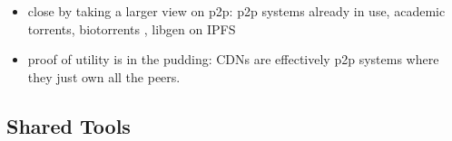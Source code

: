 \documentclass[10pt]{article}
\begin{document}
\begin{multicols}{2}
\begin{itemize}

\item
  close by taking a larger view on p2p: p2p systems already in use,
  academic torrents, biotorrents \cite{langilleBioTorrentsFileSharing2010} , libgen on IPFS
\item
  proof of utility is in the pudding: CDNs are effectively p2p systems
  where they just own all the peers.
\end{itemize}


\end{multicols}


\hypertarget{shared-tools}{%
\subsection{Shared Tools}\label{shared-tools}}
\end{document}
